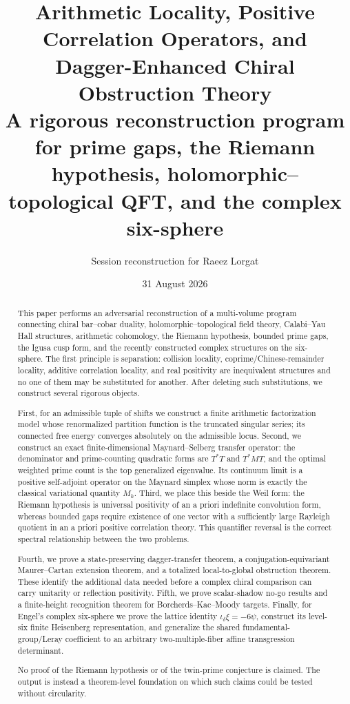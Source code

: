 \documentclass[11pt]{article}
\title{Arithmetic Locality, Positive Correlation Operators, and Dagger-Enhanced Chiral Obstruction Theory\\
\large A rigorous reconstruction program for prime gaps, the Riemann hypothesis, holomorphic--topological QFT, and the complex six-sphere}
\author{Session reconstruction for Raeez Lorgat}
\date{31 August 2026}
\theoremstyle{definition}
\theoremstyle{remark}
\newcommand{\1}{\mathbf 1}
\begin{document}
\maketitle

\begin{abstract}
This paper performs an adversarial reconstruction of a multi-volume program connecting chiral bar--cobar duality, holomorphic--topological field theory, Calabi--Yau Hall structures, arithmetic cohomology, the Riemann hypothesis, bounded prime gaps, the Igusa cusp form, and the recently constructed complex structures on the six-sphere.  The first principle is separation: collision locality, coprime/Chinese-remainder locality, additive correlation locality, and real positivity are inequivalent structures and no one of them may be substituted for another.  After deleting such substitutions, we construct several rigorous objects.

First, for an admissible tuple of shifts we construct a finite arithmetic factorization model whose renormalized partition function is the truncated singular series; its connected free energy converges absolutely on the admissible locus.  Second, we construct an exact finite-dimensional Maynard--Selberg transfer operator: the denominator and prime-counting quadratic forms are $T^*T$ and $T^*MT$, and the optimal weighted prime count is the top generalized eigenvalue.  Its continuum limit is a positive self-adjoint operator on the Maynard simplex whose norm is exactly the classical variational quantity $M_k$.  Third, we place this beside the Weil form: the Riemann hypothesis is universal positivity of an a priori indefinite convolution form, whereas bounded gaps require existence of one vector with a sufficiently large Rayleigh quotient in an a priori positive correlation theory.  This quantifier reversal is the correct spectral relationship between the two problems.

Fourth, we prove a state-preserving dagger-transfer theorem, a conjugation-equivariant Maurer--Cartan extension theorem, and a totalized local-to-global obstruction theorem.  These identify the additional data needed before a complex chiral comparison can carry unitarity or reflection positivity.  Fifth, we prove scalar-shadow no-go results and a finite-height recognition theorem for Borcherds--Kac--Moody targets.  Finally, for Engel's complex six-sphere we prove the lattice identity $\iota_\delta\xi=-6\psi$, construct its level-six finite Heisenberg representation, and generalize the shared fundamental-group/Leray coefficient to an arbitrary two-multiple-fiber affine transgression determinant.

No proof of the Riemann hypothesis or of the twin-prime conjecture is claimed.  The output is instead a theorem-level foundation on which such claims could be tested without circularity.
\end{abstract}
\end{document}
